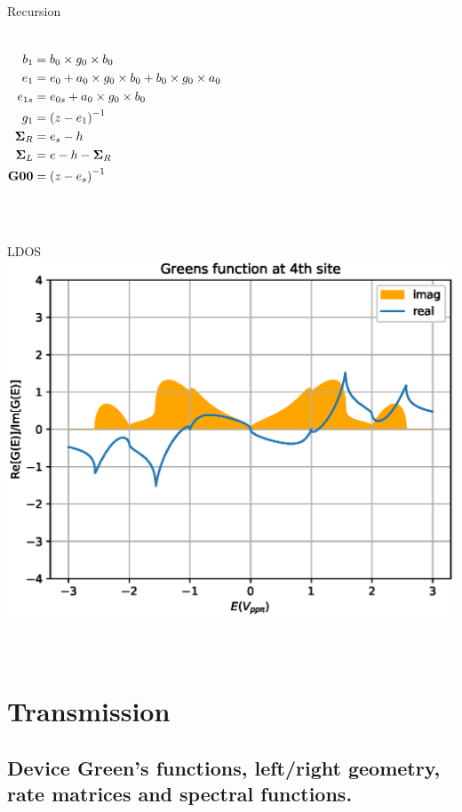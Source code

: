 \documentclass[hyperref={colorlinks=true,urlcolor=blue,linkcolor=.},aspectratio=1610,mathserif]{beamer}
\newcommand{\im}[3]{\inputminted[linenos=true, python3=true, firstline=#2, lastline=#3]{python}{#1}}
\begin{document}
\begin{frame}{Recursion}
\begin{overprint}
\begin{center}
\begin{columns}[c]
\begin{align*}
					b_1           & = b_0 \times g_0 \times b_0                                   \\
					e_1           & = e_0 + a_0 \times g_0 \times b_0 + b_0 \times g_0 \times a_0 \\
					e_{1s}        & = e_{0s} + a_0 \times g_0 \times b_0                          \\
					g_1           & = \pqty{z-e_1}^{-1}                                           \\
					\vb{\Sigma}_R & = e_s - h                                                     \\
					\vb{\Sigma}_L & = e - h - \vb{\Sigma}_R                                       \\
					\vb{G00}      & = \pqty{z-e_s}^{-1}
				\end{align*}
			\end{columns}
		\end{center}
		\begin{columns}[c]
		    \column{\textwidth}
		   	\im{Listings/Functions.py}{92}{109}
		\end{columns}
	\end{overprint}
\end{frame}

\begin{frame}{LDOS}
	\centering
	\includegraphics[width=.55\textwidth]{Figures/BetaimrealTE.eps}
	\begin{columns}[c]
	\column{\textwidth}
	    \im{Listings/SelfEnergyByRecursion.py}{64}{68}
	\end{columns}
\end{frame}

\section{Transmission}
\subsection{Device Green's functions, left/right geometry, rate matrices and spectral functions.}
\end{document}
